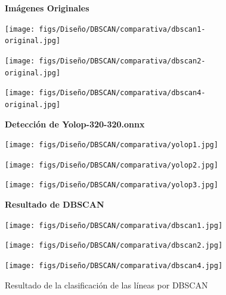 \begin{figure}[H]
  \centering

  \textbf{Imágenes Originales}
  \vspace{0.5cm}

  \begin{minipage}[t]{0.3\textwidth}
      \centering
      \texttt{[image: figs/Diseño/DBSCAN/comparativa/dbscan1-original.jpg]}
      \caption*{}
  \end{minipage}
  \hfill
  \begin{minipage}[t]{0.3\textwidth}
      \centering
      \texttt{[image: figs/Diseño/DBSCAN/comparativa/dbscan2-original.jpg]}
      \caption*{}
  \end{minipage}
  \hfill
  \begin{minipage}[t]{0.3\textwidth}
      \centering
      \texttt{[image: figs/Diseño/DBSCAN/comparativa/dbscan4-original.jpg]}
      \caption*{}
  \end{minipage}

  \vspace{1cm}

  \textbf{Detección de Yolop-320-320.onnx}
  \vspace{0.5cm}

  \begin{minipage}[t]{0.3\textwidth}
      \centering
      \texttt{[image: figs/Diseño/DBSCAN/comparativa/yolop1.jpg]}
      \caption*{}
  \end{minipage}
  \hfill
  \begin{minipage}[t]{0.3\textwidth}
      \centering
      \texttt{[image: figs/Diseño/DBSCAN/comparativa/yolop2.jpg]}
      \caption*{}
  \end{minipage}
  \hfill
  \begin{minipage}[t]{0.3\textwidth}
      \centering
      \texttt{[image: figs/Diseño/DBSCAN/comparativa/yolop3.jpg]}
      \caption*{}
  \end{minipage}

  \vspace{1cm}

  \textbf{Resultado de DBSCAN}
  \vspace{0.5cm}

  \begin{minipage}[t]{0.3\textwidth}
      \centering
      \texttt{[image: figs/Diseño/DBSCAN/comparativa/dbscan1.jpg]}
      \caption*{}
  \end{minipage}
  \hfill
  \begin{minipage}[t]{0.3\textwidth}
      \centering
      \texttt{[image: figs/Diseño/DBSCAN/comparativa/dbscan2.jpg]}
      \caption*{}
  \end{minipage}
  \hfill
  \begin{minipage}[t]{0.3\textwidth}
      \centering
      \texttt{[image: figs/Diseño/DBSCAN/comparativa/dbscan4.jpg]}
      \caption*{}
  \end{minipage}

  \caption{Resultado de la clasificación de las líneas por DBSCAN}
  \label{clasificación}
\end{figure}


